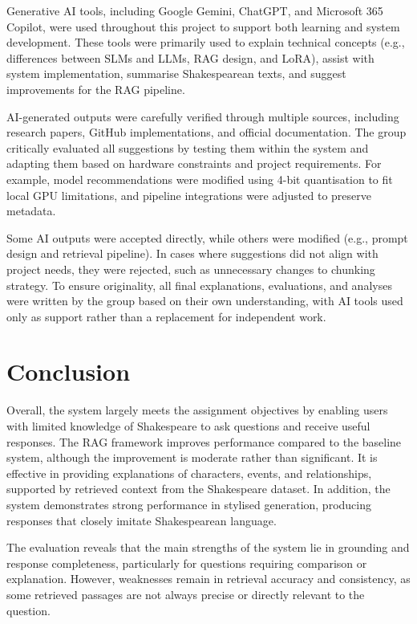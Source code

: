 \documentclass[10pt,conference]{IEEEtran}
\begin{document}
Generative AI tools, including Google Gemini, ChatGPT, and Microsoft 365 Copilot, were used throughout this project to support both learning and system development. These tools were primarily used to explain technical concepts (e.g., differences between SLMs and LLMs, RAG design, and LoRA), assist with system implementation, summarise Shakespearean texts, and suggest improvements for the RAG pipeline.

AI-generated outputs were carefully verified through multiple sources, including research papers, GitHub implementations, and official documentation. The group critically evaluated all suggestions by testing them within the system and adapting them based on hardware constraints and project requirements. For example, model recommendations were modified using 4-bit quantisation to fit local GPU limitations, and pipeline integrations were adjusted to preserve metadata.

Some AI outputs were accepted directly, while others were modified (e.g., prompt design and retrieval pipeline). In cases where suggestions did not align with project needs, they were rejected, such as unnecessary changes to chunking strategy. To ensure originality, all final explanations, evaluations, and analyses were written by the group based on their own understanding, with AI tools used only as support rather than a replacement for independent work.

\section{Conclusion}
\label{sec:conclusion}

Overall, the system largely meets the assignment objectives by enabling users with limited knowledge of Shakespeare to ask questions and receive useful responses. The RAG framework improves performance compared to the baseline system, although the improvement is moderate rather than significant. It is effective in providing explanations of characters, events, and relationships, supported by retrieved context from the Shakespeare dataset. In addition, the system demonstrates strong performance in stylised generation, producing responses that closely imitate Shakespearean language.

The evaluation reveals that the main strengths of the system lie in grounding and response completeness, particularly for questions requiring comparison or explanation. However, weaknesses remain in retrieval accuracy and consistency, as some retrieved passages are not always precise or directly relevant to the question.
\end{document}
